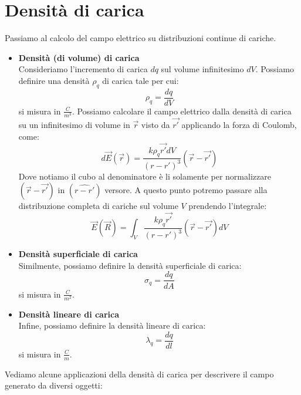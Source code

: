\documentclass[a4paper,12pt]{article}
\begin{document}
\section{Densità di carica}
Passiamo al calcolo del campo elettrico su distribuzioni continue di cariche.
\begin{itemize}
  \item \textbf{Densità (di volume) di carica} \\
    Consideriamo l'incremento di carica $dq$ sul volume infinitesimo $dV$. Possiamo definire una densità $\rho_q$ di carica tale per cui:
    $$ \rho_q = \frac{dq}{dV} $$
    si misura in $\frac{C}{m^3}$. Possiamo calcolare il campo elettrico dalla densità di carica su un infinitesimo di volume in $\vec{r}$ visto da $\vec{r'}$ applicando la forza di Coulomb, come:
    $$ d\vec{E}(\vec{r}) = \frac{k\rho_q{\vec{r'}}dV}{(r-r')^3}(\vec{r}-\vec{r'})$$
    Dove notiamo il cubo al denominatore è li solamente per normalizzare $(\vec{r} - \vec{r'})$ in $(\hat{r-r'})$ versore. A questo punto potremo passare alla distribuzione completa di cariche sul volume $V$ prendendo l'integrale:
    $$ \vec{E}(\vec{R}) = \int_V \frac{k\rho_q{\vec{r'}}}{(r-r')^3}(\vec{r}-\vec{r'})dV $$
  \item \textbf{Densità superficiale di carica} \\
    Similmente, possiamo definire la densità superficiale di carica:
    $$ \sigma_q = \frac{dq}{dA} $$
    si misura in $\frac{C}{m^2}$.
  \item \textbf{Densità lineare di carica} \\
    Infine, possiamo definire la densità lineare di carica:
    $$ \lambda_q = \frac{dq}{dl} $$
    si misura in $\frac{C}{m}$. 
\end{itemize}
Vediamo alcune applicazioni della densità di carica per descrivere il campo generato da diversi oggetti:
\end{document}
